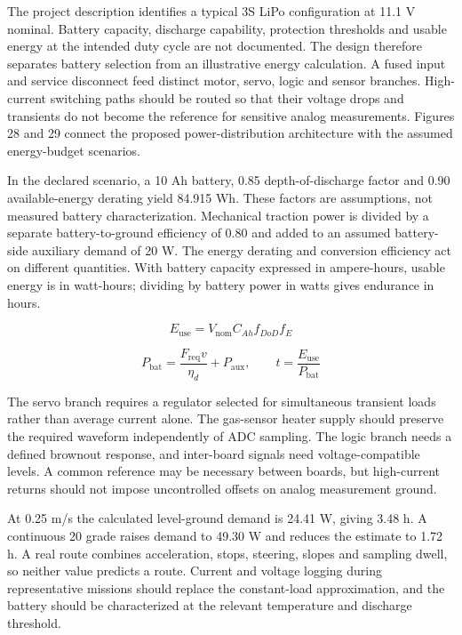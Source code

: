 \documentclass[11pt,a4paper]{article}
\begin{document}
The project description identifies a typical 3S LiPo configuration at 11.1 V nominal. Battery capacity, discharge capability, protection thresholds and usable energy at the intended duty cycle are not documented. The design therefore separates battery selection from an illustrative energy calculation. A fused input and service disconnect feed distinct motor, servo, logic and sensor branches. High-current switching paths should be routed so that their voltage drops and transients do not become the reference for sensitive analog measurements. Figures 28 and 29 connect the proposed power-distribution architecture with the assumed energy-budget scenarios.

In the declared scenario, a 10 Ah battery, 0.85 depth-of-discharge factor and 0.90 available-energy derating yield 84.915 Wh. These factors are assumptions, not measured battery characterization. Mechanical traction power is divided by a separate battery-to-ground efficiency of 0.80 and added to an assumed battery-side auxiliary demand of 20 W. The energy derating and conversion efficiency act on different quantities. With battery capacity expressed in ampere-hours, usable energy is in watt-hours; dividing by battery power in watts gives endurance in hours.

\begin{equation}
\label{eq:14}
E_{\mathrm{use}}=V_{\mathrm{nom}}C_{Ah}f_{DoD}f_E
\end{equation}

\begin{equation}
\label{eq:15}
P_{\mathrm{bat}}=\frac{F_{\mathrm{req}}v}{\eta_d}+P_{\mathrm{aux}},\qquad t=\frac{E_{\mathrm{use}}}{P_{\mathrm{bat}}}
\end{equation}

The servo branch requires a regulator selected for simultaneous transient loads rather than average current alone. The gas-sensor heater supply should preserve the required waveform independently of ADC sampling. The logic branch needs a defined brownout response, and inter-board signals need voltage-compatible levels. A common reference may be necessary between boards, but high-current returns should not impose uncontrolled offsets on analog measurement ground.

At 0.25 m/s the calculated level-ground demand is 24.41 W, giving 3.48 h. A continuous 20\textdegree{} grade raises demand to 49.30 W and reduces the estimate to 1.72 h. A real route combines acceleration, stops, steering, slopes and sampling dwell, so neither value predicts a route. Current and voltage logging during representative missions should replace the constant-load approximation, and the battery should be characterized at the relevant temperature and discharge threshold.
\end{document}

